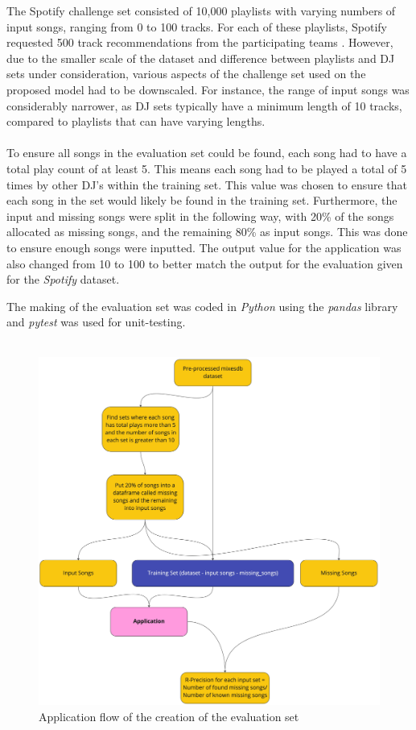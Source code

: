 The Spotify challenge set consisted of 10,000 playlists with varying numbers of input songs, ranging from 0 to 100 tracks. For each of these playlists, Spotify requested 500 track recommendations from the participating teams \citep{aicrowd_aicrowd_2023}. However, due to the smaller scale of the dataset and difference between playlists and DJ sets under consideration, various aspects of the  challenge set used on the proposed model had to be downscaled. For instance, the range of input songs was considerably narrower, as DJ sets typically have a minimum length of 10 tracks, compared to playlists that can have varying lengths.
\\
\\
To ensure all songs in the evaluation set could be found, each song had to have a total play count of at least 5. This means each song had to be played a total of 5 times by other DJ's within the training set. This value was chosen to ensure that each song in the set would likely be found in the training set. Furthermore, the input and missing songs were split in the following way, with 20\% of the songs allocated as missing songs, and the remaining 80\% as input songs. This was done to ensure enough songs were inputted. The output value for the application was also changed from 10 to 100 to better match the output for the evaluation given for the \textit{Spotify} dataset.

The making of the evaluation set was coded in \textit{Python} using the \textit{pandas} library and \textit{pytest} was used for unit-testing.
\\
\\
\begin{figure}[H]
	\includegraphics[scale=0.1]{images/evaluation_set_app_flow}
	\centering
	\caption{Application flow of the creation of the evaluation set} 
\end{figure}
\break
